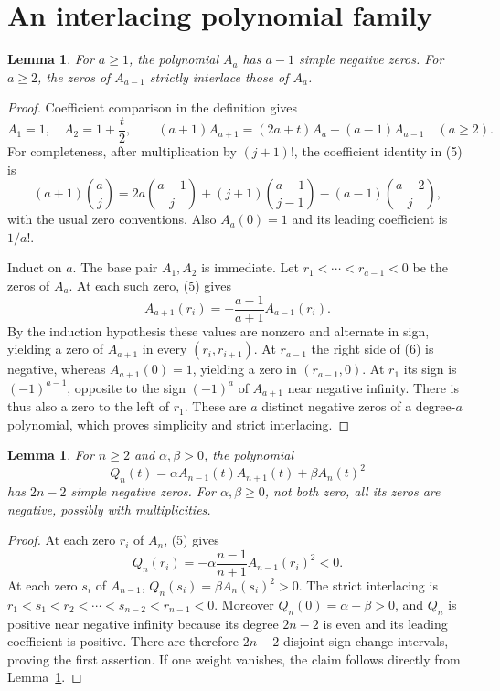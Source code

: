 \documentclass[10pt]{article}
\newtheorem{lemma}[theorem]{Lemma}
\begin{document}
\section{An interlacing polynomial family}
\begin{lemma}\label{family}
For $a\ge1$, the polynomial $A_a$ has $a-1$ simple negative zeros.
For $a\ge2$, the zeros of $A_{a-1}$ strictly interlace those of $A_a$.
\end{lemma}
\begin{proof}
Coefficient comparison in the definition gives
\[
 A_1=1,\quad A_2=1+\frac t2,\qquad
 (a+1)A_{a+1}=(2a+t)A_a-(a-1)A_{a-1}\quad(a\ge2).     \tag{5}
\]
For completeness, after multiplication by $(j+1)!$, the coefficient
identity in (5) is
\[
 (a+1)\binom aj
 =2a\binom{a-1}j+(j+1)\binom{a-1}{j-1}
                    -(a-1)\binom{a-2}j,
\]
with the usual zero conventions.
Also $A_a(0)=1$ and its leading coefficient is $1/a!$.

Induct on $a$. The base pair $A_1,A_2$ is immediate.
Let $r_1<\cdots<r_{a-1}<0$ be the zeros of $A_a$.
At each such zero, (5) gives
\[
 A_{a+1}(r_i)=-\frac{a-1}{a+1}A_{a-1}(r_i).            \tag{6}
\]
By the induction hypothesis these values are nonzero and alternate
in sign, yielding a zero of $A_{a+1}$ in every $(r_i,r_{i+1})$.
At $r_{a-1}$ the right side of (6) is negative, whereas
$A_{a+1}(0)=1$, yielding a zero in $(r_{a-1},0)$.
At $r_1$ its sign is $(-1)^{a-1}$, opposite to the sign
$(-1)^a$ of $A_{a+1}$ near negative infinity.
There is thus also a zero to the left of $r_1$.
These are $a$ distinct negative zeros of a degree-$a$ polynomial,
which proves simplicity and strict interlacing.
\end{proof}

\begin{lemma}\label{sum}
For $n\ge2$ and $\alpha,\beta>0$, the polynomial
\[
 Q_n(t)=\alpha A_{n-1}(t)A_{n+1}(t)+\beta A_n(t)^2
\]
has $2n-2$ simple negative zeros.
For $\alpha,\beta\ge0$, not both zero, all its zeros are negative,
possibly with multiplicities.
\end{lemma}
\begin{proof}
At each zero $r_i$ of $A_n$, (5) gives
\[
 Q_n(r_i)=-\alpha\frac{n-1}{n+1}A_{n-1}(r_i)^2<0.
\]
At each zero $s_i$ of $A_{n-1}$, $Q_n(s_i)=\beta A_n(s_i)^2>0$.
The strict interlacing is
$r_1<s_1<r_2<\cdots<s_{n-2}<r_{n-1}<0$.
Moreover $Q_n(0)=\alpha+\beta>0$, and $Q_n$ is positive near
negative infinity because its degree $2n-2$ is even and its leading
coefficient is positive. There are therefore $2n-2$ disjoint
sign-change intervals, proving the first assertion. If one weight
vanishes, the claim follows directly from Lemma~\ref{family}.
\end{proof}
\end{document}
